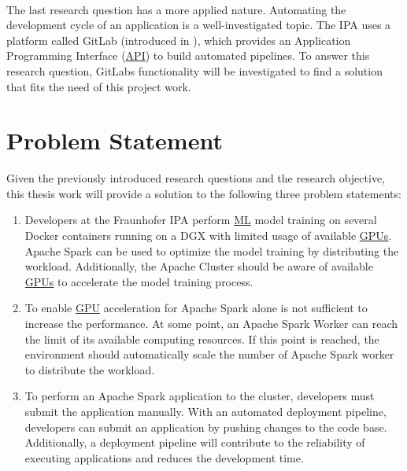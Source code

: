 \paragraph{}
The last research question has a more applied nature.
Automating the development cycle of an application is a well-investigated topic.
The IPA uses a platform called GitLab (introduced in ), which provides an Application Programming Interface (\hyperlink{abbr:api}{API}) to build automated pipelines.
To answer this research question, GitLabs functionality will be investigated to find a solution that fits the need of this project work.


\section{Problem Statement}
\label{sec:01_introduction_problem}
Given the previously introduced research questions and the research objective, this thesis work will provide a solution to the following three problem statements:

\begin{enumerate}
\item Developers at the Fraunhofer IPA perform \hyperlink{abbr:ml}{ML} model training on several Docker containers running on a DGX with limited usage of available \hyperlink{abbr:gpu}{GPUs}.
Apache Spark can be used to optimize the model training by distributing the workload.
Additionally, the Apache Cluster should be aware of available \hyperlink{abbr:gpu}{GPUs} to accelerate the model training process.

\item To enable \hyperlink{abbr:gpu}{GPU} acceleration for Apache Spark alone is not sufficient to increase the performance.
At some point, an Apache Spark Worker can reach the limit of its available computing resources.
If this point is reached, the environment should automatically scale the number of Apache Spark worker to distribute the workload.

\item To perform an Apache Spark application to the cluster, developers must submit the application manually.
With an automated deployment pipeline, developers can submit an application by pushing changes to the code base.
Additionally, a deployment pipeline will contribute to the reliability of executing applications and reduces the development time.
\end{enumerate}


